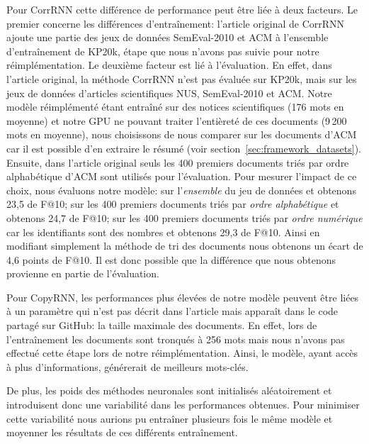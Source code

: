 Pour CorrRNN cette différence de performance peut être liée à deux facteurs.
Le premier concerne les différences d'entraînement: l'article original de CorrRNN ajoute une partie des jeux de données SemEval-2010 et ACM à l'ensemble d'entraînement de KP20k, étape que nous n'avons pas suivie pour notre réimplémentation.
Le deuxième facteur est lié à l'évaluation.
En effet, dans l'article original, la méthode CorrRNN n'est pas évaluée sur KP20k, mais sur les jeux de données d'articles scientifiques NUS, SemEval-2010 et ACM.
Notre modèle réimplémenté étant entraîné sur des notices scientifiques (176 mots en moyenne) et notre GPU ne pouvant traiter l'entièreté de ces documents (9\,200 mots en moyenne), nous choisissons de nous comparer sur les documents d'ACM car il est possible d'en extraire le résumé (voir section~\ref{sec:framework_datasets}).
Ensuite, dans l'article original seuls les 400 premiers documents triés par ordre alphabétique d'ACM sont utilisés pour l'évaluation.
Pour mesurer l'impact de ce choix, nous évaluons notre modèle: sur l'\emph{ensemble} du jeu de données et obtenons 23,5 de F@10; sur les 400 premiers documents triés par \emph{ordre alphabétique} et obtenons 24,7 de F@10; sur les 400 premiers documents triés par \emph{ordre numérique} car les identifiants sont des nombres et obtenons 29,3 de F@10.
Ainsi en modifiant simplement la méthode de tri des documents nous obtenons un écart de 4,6 points de F@10.
Il est donc possible que la différence que nous obtenons provienne en partie de l'évaluation.

Pour CopyRNN, les performances plus élevées de notre modèle peuvent être liées à un paramètre qui n'est pas décrit dans l'article mais apparaît dans le code partagé sur GitHub: la taille maximale des documents.
En effet, lors de l'entraînement les documents sont tronqués à 256 mots mais nous n'avons pas effectué cette étape lors de notre réimplémentation.
Ainsi, le modèle, ayant accès à plus d'informations, générerait de meilleurs mots-clés.

De plus, les poids des méthodes neuronales sont initialisés aléatoirement et introduisent donc une variabilité dans les performances obtenues. Pour minimiser cette variabilité nous aurions pu entraîner plusieurs fois le même modèle et moyenner les résultats de ces différents entraînement.

